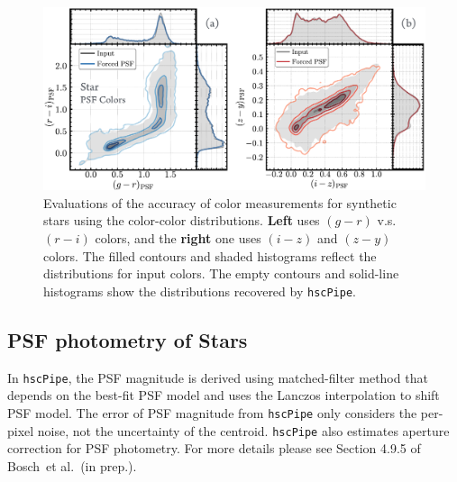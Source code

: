 \documentclass[useamsfonts]{pasj01}
\def\etal{{\ et al.~}}
\def\hscpipe{\texttt{hscPipe}}
\begin{document}
\begin{figure}
    \begin{center}
        \includegraphics[width=\textwidth]{fig/synpipe_psf_cdist}
    \end{center}
    \caption{
        Evaluations of the accuracy of color measurements for synthetic stars using
        the color-color distributions.
        \textbf{Left} uses $(g-r)$ v.s. $(r-i)$ colors, and the \textbf{right} one
        uses $(i-z)$ and $(z-y)$ colors.
        The filled contours and shaded histograms reflect the distributions for input
        colors.
        The empty contours and solid-line histograms show the distributions recovered
        by \hscpipe{}.
        }
    \label{fig:psf_cdist}
\end{figure}

\subsection{PSF photometry of Stars}
    \label{ssec:psf}

    In \hscpipe{}, the PSF magnitude is derived using matched-filter method that
    depends on the best-fit PSF model and uses the Lanczos interpolation to shift
    PSF model.
    The error of PSF magnitude from \hscpipe{} only considers the per-pixel noise,
    not the uncertainty of the centroid.
    \hscpipe{} also estimates aperture correction for PSF photometry.
    For more details please see Section 4.9.5 of Bosch\etal (in prep.).
\end{document}
